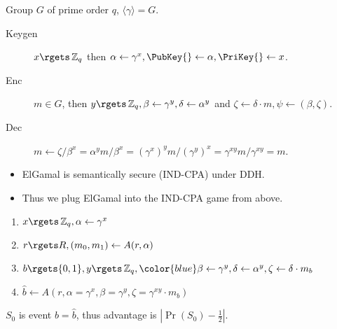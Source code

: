 \begin{frame}
  \begin{example}
    Group \(G\) of prime order \(q\), \(\langle\gamma\rangle = G\).
    \begin{description}
      \item[Keygen] \(x\rgets \Z_q\) then
        \(\alpha\gets \gamma^x, \PubKey{}\gets \alpha, \PriKey{}\gets x\).

      \item[Enc] \(m\in G\), then \(y\rgets \Z_q, \beta\gets \gamma^y, 
          \delta\gets \alpha^y\) and
        \(\zeta\gets \delta\cdot m, \psi\gets (\beta, \zeta)\).

      \item[Dec] \(m\gets \zeta/\beta^x = \alpha^y m/\beta^x = (\gamma^x)^y 
          m/(\gamma^y)^x = \gamma^{xy}m/\gamma^{xy} = m\).
    \end{description}
  \end{example}
\end{frame}

\begin{frame}
  \begin{itemize}
    \item ElGamal is semantically secure (IND-CPA) under \ac{DDH}.
    \item Thus we plug ElGamal into the IND-CPA game from above.
  \end{itemize}
\end{frame}

\begin{frame}
  \begin{example}
    \begin{enumerate}
      \item \(x\rgets \Z_q, \alpha\gets\gamma^x\)
      \item \(r\rgets R, (m_0, m_1)\gets A(r, \alpha)\)
      \item \(b\rgets \{0,1\}, y\rgets \Z_q,
          {\color{blue} \beta\gets \gamma^y, \delta\gets \alpha^y,
          \zeta\gets \delta\cdot m_b}\)
      \item \(\hat{b}\gets A(r,
          \alpha = \gamma^x, \beta = \gamma^y, \zeta = \gamma^{xy}\cdot m_b)\)
    \end{enumerate}
    \(S_0\) is event \(b = \hat{b}\), thus advantage is \(|\Pr(S_0) 
      - \frac{1}{2}|\).
  \end{example}
\end{frame}

